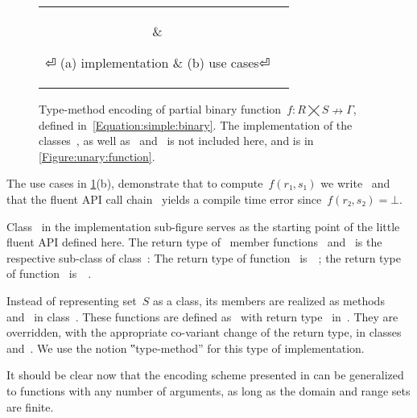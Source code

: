\begin{figure}[hbt]
  \caption{\label{Figure:simple:binary}%
  Type-method encoding of partial binary function~$f: R⨉S↛Γ$,
  defined in~\cref{Equation:simple:binary}. The implementation of the classes~, 
  as well as~ and~ is not included here, and is
  in \cref{Figure:unary:function}.}

  \begin{tabular}{cc}
   \hspace{-2.5ex}
   \parbox[c]{0.57\linewidth}{%
   }
   &
   \hspace{-2.5ex}
   \parbox[c]{0.48\linewidth}{%
   }
⏎
   \hspace{-7ex}(a) implementation & \hspace{-5ex}(b) use cases⏎
  \end{tabular}
\end{figure}

The use cases in \cref{Figure:simple:binary}(b), demonstrate
  that to compute~$f(r₁,s₁)$ we write~
  and that the fluent API call chain~ yields
  a compile time error since~$f(r₂, s₂)=⊥$.

Class~ in the implementation sub-figure serves as
  the starting point of the little fluent API defined here.
The return type of~ member functions~ and~
  is the respective sub-class of class~:
The return type of function~ is~~;
  the return type of function~ is~~.

Instead of representing set~$S$ as a class,
  its members are realized as methods~ and~ in  class~.
These functions are defined as~ with return type~
  in~. 
They are overridden, with the appropriate co-variant change of the return type,
  in classes~ and~.
We use the notion ‟type-method” for this type of implementation.

It should be clear now that the encoding scheme presented in  can be generalized to functions
  with any number of arguments, as long as the domain and range sets are finite. 

